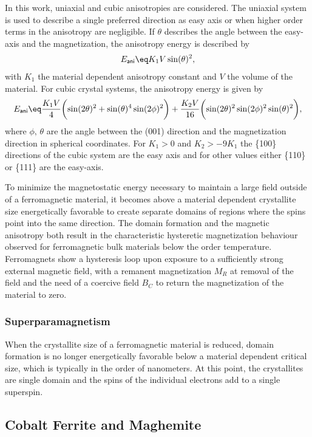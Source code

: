 \documentclass[\main/dresen_thesis.tex]{subfiles}
\begin{document}
    In this work, uniaxial and cubic anisotropies are considered.
    The uniaxial system is used to describe a single preferred direction as easy axis or when higher order terms in the anisotropy are negligible.
    If $\theta$ describes the angle between the easy-axis and the magnetization, the anisotropy energy is described by
    \begin{align}
      E_\mathsf{ani} \eq K_1 V \sin(\theta)^2,
    \end{align}
    with $K_1$ the material dependent anisotropy constant and $V$ the volume of the material.
    For cubic crystal systems, the anisotropy energy is given by
    \begin{align}
      E_\mathsf{ani} \eq
        \frac{K_1 V}{4} \biggl(\sin(2 \theta)^2 + \sin(\theta)^4 \sin(2\phi)^2 \biggr) +
        \frac{K_2 V}{16} \biggl( \sin(2 \theta)^2 \sin(2 \phi)^2 \sin(\theta)^2 \biggr),
    \end{align}
    where $\phi, \, \theta$ are the angle between the (001) direction and the magnetization direction in spherical coordinates.
    For $K_1 > 0$ and $K_2 > -9 K_1$ the \{100\} directions of the cubic system are the easy axis and for other values either \{110\} or \{111\} are the easy-axis.

    To minimize the magnetostatic energy necessary to maintain a large field outside of a ferromagnetic material, it becomes above a material dependent crystallite size energetically favorable to create separate domains of regions where the spins point into the same direction.
    The domain formation and the magnetic anisotropy both result in the characteristic hysteretic magnetization behaviour observed for ferromagnetic bulk materials below the order temperature.
    Ferromagnets show a hysteresis loop upon exposure to a sufficiently strong external magnetic field, with a remanent magnetization $M_R$ at removal of the field and the need of a coercive field $B_C$ to return the magnetization of the material to zero.

  \subsubsection{Superparamagnetism}
    When the crystallite size of a ferromagnetic material is reduced, domain formation is no longer energetically favorable below a material dependent critical size, which is typically in the order of nanometers.
    At this point, the crystallites are single domain and the spins of the individual electrons add to a single superspin.


  \subsection{Cobalt Ferrite and Maghemite}
\end{document}
